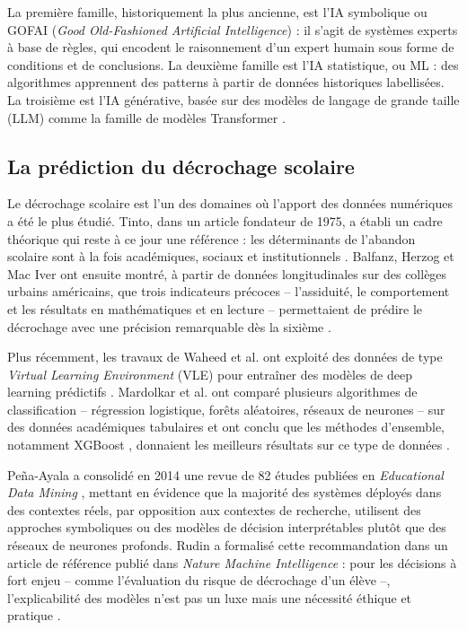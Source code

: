 \documentclass[12pt,a4paper,oneside]{report}
\begin{document}
La première famille, historiquement la plus ancienne, est l'\ac{IA} symbolique ou GOFAI (\textit{Good Old-Fashioned Artificial Intelligence}) : il s'agit de systèmes experts à base de règles, qui encodent le raisonnement d'un expert humain sous forme de conditions et de conclusions. La deuxième famille est l'IA statistique, ou \ac{ML} : des algorithmes apprennent des patterns à partir de données historiques labellisées. La troisième est l'IA générative, basée sur des modèles de langage de grande taille (\ac{LLM}) comme la famille de modèles Transformer \autocite{vaswani2017attention}.

\subsection{La prédiction du décrochage scolaire}

Le décrochage scolaire est l'un des domaines où l'apport des données numériques a été le plus étudié. Tinto, dans un article fondateur de 1975, a établi un cadre théorique qui reste à ce jour une référence : les déterminants de l'abandon scolaire sont à la fois académiques, sociaux et institutionnels \autocite{tinto1975dropout}. Balfanz, Herzog et Mac Iver ont ensuite montré, à partir de données longitudinales sur des collèges urbains américains, que trois indicateurs précoces -- l'assiduité, le comportement et les résultats en mathématiques et en lecture -- permettaient de prédire le décrochage avec une précision remarquable dès la sixième \autocite{balfanz2007preventing}.

Plus récemment, les travaux de Waheed et al. ont exploité des données de type \textit{Virtual Learning Environment} (VLE) pour entraîner des modèles de deep learning prédictifs \autocite{waheed2020predicting}. Mardolkar et al. ont comparé plusieurs algorithmes de classification -- régression logistique, forêts aléatoires, réseaux de neurones -- sur des données académiques tabulaires et ont conclu que les méthodes d'ensemble, notamment XGBoost \autocite{chen2016xgboost}, donnaient les meilleurs résultats sur ce type de données \autocite{mardolkar2021forecasting}.

Peña-Ayala a consolidé en 2014 une revue de 82 études publiées en \textit{Educational Data Mining} \autocite{penaayla2014educational}, mettant en évidence que la majorité des systèmes déployés dans des contextes réels, par opposition aux contextes de recherche, utilisent des approches symboliques ou des modèles de décision interprétables plutôt que des réseaux de neurones profonds. Rudin a formalisé cette recommandation dans un article de référence publié dans \textit{Nature Machine Intelligence} : pour les décisions à fort enjeu -- comme l'évaluation du risque de décrochage d'un élève --, l'explicabilité des modèles n'est pas un luxe mais une nécessité éthique et pratique \autocite{rudin2019stop}.
\end{document}
